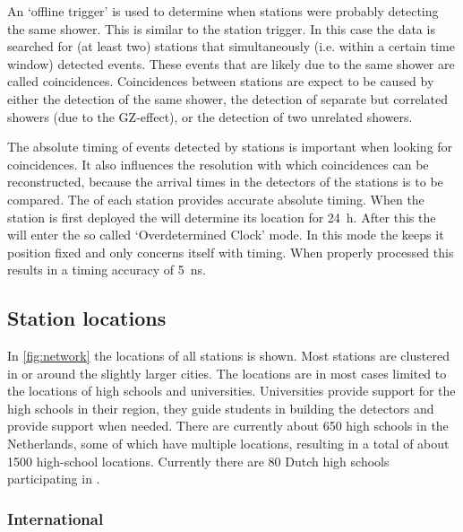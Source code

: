 An `offline trigger' is used to determine when stations were probably detecting the same shower. This is similar to the station trigger. In this case the data is searched for (at least two) stations that simultaneously (i.e. within a certain time window) detected events. These events that are likely due to the same shower are called coincidences. Coincidences between stations are expect to be caused by either the detection of the same shower, the detection of separate but correlated showers (due to the GZ-effect), or the detection of two unrelated showers.

The absolute timing of events detected by stations is important when looking for coincidences. It also influences the resolution with which coincidences can be reconstructed, because the arrival times in the detectors of the stations is to be compared. The \gps of each station provides accurate absolute timing. When the station is first deployed the \gps will determine its location for \SI{24}{\hour}. After this the \gps will enter the so called `Overdetermined Clock' mode. In this mode the \gps keeps it position fixed and only concerns itself with timing. When properly processed this results in a timing accuracy of \SI{5}{\ns}.

\subsection{Station locations}

In \cref{fig:network} the locations of all \hisparc stations is shown. Most stations are clustered in or around the slightly larger cities. The locations are in most cases limited to the locations of high schools and universities. Universities provide support for the high schools in their region, they guide students in building the detectors and provide support when needed. There are currently about \num{650} high schools in the Netherlands, some of which have multiple locations, resulting in a total of about \num{1500} high-school locations. Currently there are \num{80} Dutch high schools participating in \hisparc.

\subsubsection{International}

